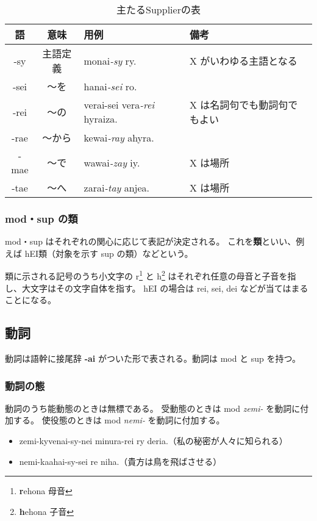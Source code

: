 \begin{table}[h]
    \centering
    \caption{主たるSupplierの表}
    \begin{tabular}{ccll}
        \hline
        語 & 意味 & 用例 & 備考 \\
        \hline \hline
        -sy   & 主語定義 & monai\emph{-sy} ry. & X がいわゆる主語となる \\
        -sei  & ～を & hanai\emph{-sei} ro.           & \\
        -rei  & ～の & verai-sei vera\emph{-rei} hyraiza.   & X は名詞句でも動詞句でもよい \\
        -rae & ～から & kewai\emph{-ray} ahyra.            & \\
        -mae & ～で & wawai\emph{-zay} iy.           & X は場所 \\
        -tae & ～へ & zarai\emph{-tay} anjea.              & X は場所 \\
        \hline
    \end{tabular}
\end{table}

\subsubsection{mod・sup の類}
mod・sup はそれぞれの関心に応じて表記が決定される。
これを\textbf{類}といい、例えば hEI類（対象を示す sup の類）などという。

類に示される記号のうち小文字の r\footnote{\textbf{r}ehona 母音} と h\footnote{\textbf{h}ehona 子音} はそれぞれ任意の母音と子音を指し、大文字はその文字自体を指す。
hEI の場合は rei, sei, dei などが当てはまることになる。

\subsection{動詞}

動詞は語幹に接尾辞 \textbf{-ai} がついた形で表される。動詞は mod と sup を持つ。

\subsubsection{動詞の態}

動詞のうち能動態のときは無標である。
受動態のときは mod \emph{zemi-} を動詞に付加する。
使役態のときは mod \emph{nemi-} を動詞に付加する。

\begin{itemize}
    \item zemi-kyvenai-sy-nei minura-rei ry deria.（私の秘密が人々に知られる）
    \item nemi-kaahai-sy-sei re niha.（貴方は鳥を飛ばさせる）
\end{itemize}

